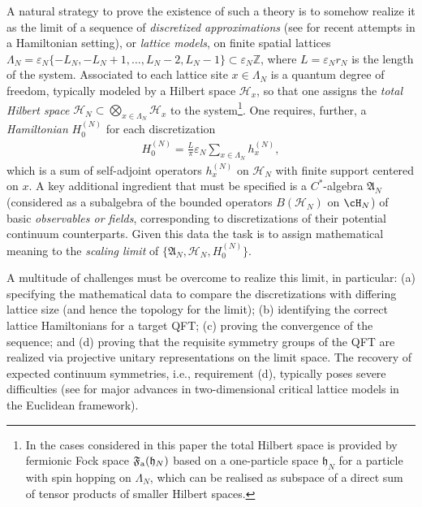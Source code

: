 \documentclass[a4paper, 11pt]{article}
\newcommand{\ua}{\textup a}
\newcommand{\fF}{\mathfrak{F}}\newcommand{\cF}{\mathcal{F}}\newcommand{\dF}{\mathds{F}}\newcommand{\sF}{\mathscr{F}}
\DeclareMathOperator{\1}{\mathds{1}}
\begin{document}
A natural strategy to prove the existence of such a theory is to somehow realize it as the limit of a sequence of \emph{discretized approximations} (see \cite{JonesSomeUnitaryRepresentations, JonesANoGo, JonesScaleInvariantTransfer, BrothierConstructionsOfConformal, KlieschContinuumLimitsOf, OsborneQuantumFieldsFor} for recent attempts in a Hamiltonian setting), or \emph{lattice models}, on finite spatial lattices $\Lambda_{N} = \varepsilon_{N}\{-L_{N}, -L_{N} +1, \ldots, L_{N}-2, L_{N}-1\}\subset\varepsilon_{N}  \mathbb{Z}$, where $L=\varepsilon_N r_N$ is the length of the system. Associated to each lattice site $x\in \Lambda_N$ is a quantum degree of freedom, typically modeled by a Hilbert space $\mathcal{H}_x$, so that one assigns the \emph{total Hilbert space} $\mathcal{H}_{N} \subset \bigotimes_{x\in \Lambda_{N}} \mathcal{H}_x$ to the system\footnote{In the cases considered in this paper the total Hilbert space is provided by fermionic Fock space $\fF_{\ua}(\mathfrak{h}_{N})$ based on a one-particle space $\mathfrak{h}_{N}$ for a particle with spin hopping on $\Lambda_N$, which can be realised as subspace of a direct sum of tensor products of smaller Hilbert spaces.}. One requires, further, a \emph{Hamiltonian} $H_{0}^{(N)}$ for each discretization
\begin{align*}
H^{(N)}_0 = \tfrac{L}{\pi}\varepsilon_N\sum_{x\in\Lambda_N} h_x^{(N)},
\end{align*}
which is a sum of self-adjoint operators $h_x^{(N)}$ on $\mathcal{H}_N$ with finite support centered on $x$. A key additional ingredient that must be specified is a $C^{*}$-algebra $\mathfrak{A}_N$ (considered as a subalgebra of the bounded operators $B(\mathcal{H}_N)$ on $\cH_{N}$) of basic \emph{observables or fields}, corresponding to discretizations of their potential continuum counterparts. Given this data the task is to assign mathematical meaning to the \emph{scaling limit} of $\{\mathfrak{A}_N, \mathcal{H}_N, H^{(N)}_0\}$. 

A multitude of challenges must be overcome to realize this limit, in particular: (a) specifying the mathematical data to compare the discretizations with differing lattice size (and hence the topology for the limit); (b) identifying the correct lattice Hamiltonians for a target QFT; (c) proving the convergence of the sequence; and (d) proving that the requisite symmetry groups of the QFT are realized via projective unitary representations on the limit space. The recovery of expected continuum symmetries, i.e., requirement (d), typically poses severe difficulties (see \cite{SmirnovTowardsConformalInvariance, ChelkakUniversalityInThe, HonglerConformalFieldTheory, DuminilCopinRotationalInvarianceIn} for major advances in two-dimensional critical lattice models in the Euclidean framework).
\end{document}

